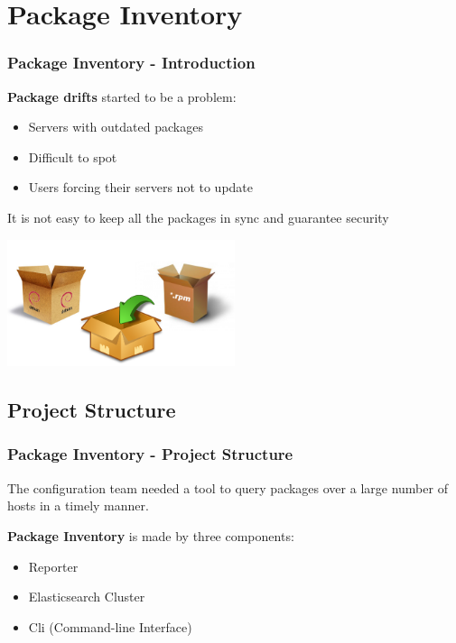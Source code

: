 \documentclass[aspectratio=169]{beamer}
\begin{document}
\section{Package Inventory}

\begin{frame}
    \frametitle{Package Inventory - Introduction}
    \vspace{10px}
    \begin{minipage}[t]{0.95\textwidth}
        \textbf{Package drifts} started to be a problem:
        \begin{itemize}
            \item Servers with outdated packages
            \item Difficult to spot
            \item Users forcing their servers not to update
        \end{itemize}
        It is not easy to keep all the packages in sync and guarantee security
    \end{minipage}
    \vspace{\belowdisplayskip}
    \begin{minipage}[t]{0.95\textwidth}
        \begin{center}
            \includegraphics[width=0.5\textwidth]{package.png}
        \end{center}
    \end{minipage}
\end{frame}


\subsection{Project Structure}
\begin{frame}
    \frametitle{Package Inventory - Project Structure}
    The configuration team needed a tool to query packages over a large
    number of hosts in a timely manner.

    \textbf{Package Inventory} is made by three components:
    \begin{itemize}
        \item Reporter
        \item Elasticsearch Cluster
        \item Cli (Command-line Interface)
    \end{itemize}
\end{frame}
\end{document}
